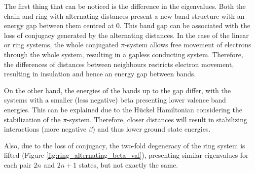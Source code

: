 \documentclass{article}
\begin{document}
The first thing that can be noticed is the difference in the eigenvalues. Both the chain and ring with alternating distances present a new band structure with an energy gap between them centred at $0$. This band gap can be associated with the loss of conjugacy generated by the alternating distances. In the case of the linear or ring systems, the whole conjugated $\pi$-system allows free movement of electrons through the whole system, resulting in a gapless conducting system. Therefore, the differences of distances between neighbours restricts electron movement, resulting in insulation and hence an energy gap between bands. 

On the other hand, the energies of the bands up to the gap differ, with the systems with a smaller (less negative) beta presenting lower valence band energies. This can be explained due to the Hückel Hamiltonian considering the stabilization of the $\pi$-system. Therefore, closer distances will result in stabilizing interactions (more negative $\beta$) and thus lower ground state energies. 

Also, due to the loss of conjugacy, the two-fold degeneracy of the ring system is lifted (Figure \ref{fig:ring_alternating_beta_val}), presenting similar eigenvalues for each pair $2n$ and $2n+1$ states, but not exactly the same.
\end{document}
